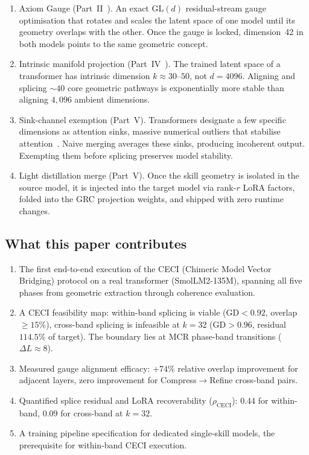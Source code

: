 \documentclass[11pt]{article}
\begin{document}
\begin{enumerate}
\item Axiom Gauge (Part~II~\cite{stewart2026gp}). An exact
 $\mathrm{GL}(d)$ residual-stream gauge optimisation that rotates
 and scales the latent space of one model until its geometry
 overlaps with the other. Once the gauge is locked, dimension~42
 in both models points to the same geometric concept.

\item Intrinsic manifold projection (Part~IV~\cite{stewart2026ott}).
 The trained latent space of a transformer has intrinsic dimension
 $k{\approx}30$--$50$, not $d{=}4096$. Aligning and splicing
 ${\sim}40$ core geometric pathways is exponentially more stable
 than aligning $4{,}096$ ambient dimensions.

\item Sink-channel exemption (Part~V). Transformers designate
 a few specific dimensions as attention sinks, massive numerical
 outliers that stabilise attention~\cite{sun2024massive,
 xiao2023streamingllm}. Naive merging averages these sinks,
 producing incoherent output. Exempting them before splicing
 preserves model stability.

\item Light distillation merge (Part~V). Once the skill
 geometry is isolated in the source model, it is injected into the
 target model via rank-$r$ LoRA factors, folded into the GRC
 projection weights, and shipped with zero runtime changes.
\end{enumerate}

\subsection{What this paper contributes}

\begin{enumerate}
\item The first end-to-end execution of the CECI (Chimeric Model Vector
 Bridging) protocol on a real transformer (SmolLM2-135M), spanning
 all five phases from geometric extraction through coherence
 evaluation.
\item A CECI feasibility map: within-band splicing is viable
 (GD${<}0.92$, overlap ${\ge}15\%$), cross-band splicing is
 infeasible at $k{=}32$ (GD${>}0.96$, residual $114.5\%$ of target).
 The boundary lies at MCR phase-band transitions ($\Delta L{\approx}8$).
\item Measured gauge alignment efficacy: $+74\%$ relative overlap
 improvement for adjacent layers, zero improvement for
 Compress$\to$Refine cross-band pairs.
\item Quantified splice residual and LoRA recoverability ($\rho_{\mathrm{CECI}}$):
 $0.44$ for within-band, $0.09$ for cross-band at $k{=}32$.
\item A training pipeline specification for dedicated single-skill
 models, the prerequisite for within-band CECI execution.
\end{enumerate}
\end{document}
